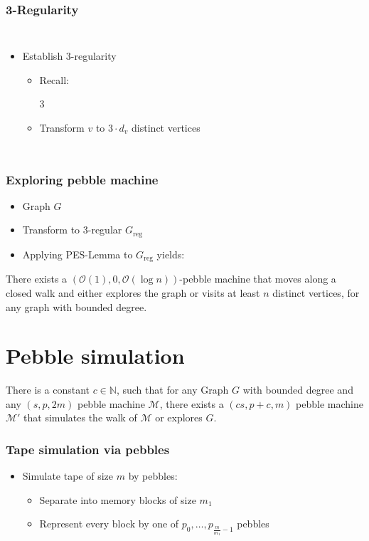 \documentclass{beamer}
\begin{document}
\begin{frame}
  \frametitle{3-Regularity}
  \begin{columns}
    \begin{itemize}
      \item Establish 3-regularity
        \begin{itemize}
          \item Recall: \parbox{3\baselineskip}{\resizebox{!}
            {3\baselineskip}{}}
          \item<2-> Transform $v$ to $3\cdot d_{v}$ distinct vertices
        \end{itemize}
    \end{itemize}
  \end{columns}
\end{frame}

\begin{frame}
  \frametitle{Exploring pebble machine}
  \begin{itemize}
    \item Graph $G$
    \item Transform to 3-regular $G_{\text{reg}}$
    \item Applying PES-Lemma to $G_{\text{reg}}$ yields:
  \end{itemize}
  \begin{theorem}
    There exists a $(\mathcal{O}(1), 0, \mathcal{O}(\log n))$-pebble machine
    that moves along a closed walk and either explores the graph or visits at
    least $n$ distinct vertices, for any graph with bounded degree.
  \end{theorem}
\end{frame}

\section{Pebble simulation}
\begin{frame}
  \begin{theorem}
    There is a constant $c\in\mathbb{N}$, such that for any Graph $G$
    with bounded degree and any $(s,p,2m)$ pebble machine $\mathcal{M}$, there
    exists a $(cs,p+c,m)$ pebble machine $\mathcal{M}'$ that simulates the walk
    of $\mathcal{M}$ or explores $G$.
  \end{theorem}
\end{frame}

\begin{frame}
  \frametitle{Tape simulation via pebbles}
  \begin{itemize}
    \item Simulate tape of size $m$ by pebbles:
      \begin{itemize}
        \item<3-> Separate into memory blocks of size $m_{1}$
        \item<4-> Represent every block by one of
          $p_{0},\dots,p_{\frac{m}{m_{1}}-1}$ pebbles
      \end{itemize}
  \end{itemize}
\end{frame}
\end{document}

